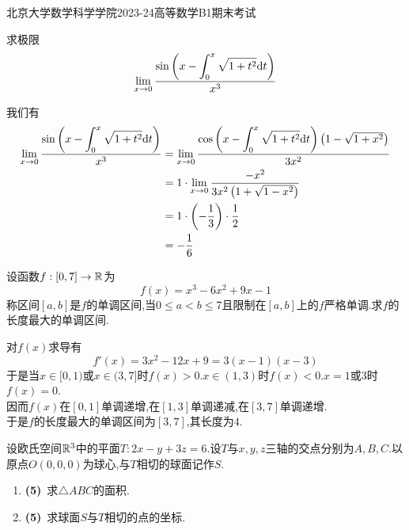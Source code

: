 \documentclass{ctexart}
\begin{document}
\pagestyle{empty}
\begin{center}\Large
    北京大学数学科学学院2023-24高等数学B1期末考试
\end{center}
\begin{problem}[1.(10\songti{分})]
    求极限\[\lim_{x\to0}\dfrac{\sin\left(x-\displaystyle\int_0^x\sqrt{1+t^2}\mathrm{d} t\right)}{x^3}\]
\end{problem}
\begin{solution}
    我们有
    \[\begin{aligned}
        \lim_{x\to0}\dfrac{\sin\left(x-\displaystyle\int_0^x\sqrt{1+t^2}\mathrm{d} t\right)}{x^3}
        &= \lim_{x\to0}\dfrac{\cos\left(x-\displaystyle\int_0^x\sqrt{1+t^2}\mathrm{d} t\right)\left(1-\sqrt{1+x^2}\right)}{3x^2} \\
        &= 1\cdot\lim_{x\to0}\dfrac{-x^2}{3x^2\left(1+\sqrt{1-x^2}\right)} \\
        &= 1\cdot\left(-\dfrac13\right)\cdot\dfrac12 \\
        &= -\dfrac16
    \end{aligned}\]
\end{solution}
\begin{problem}[2.(10\songti{分})]
    设函数$f:[0,7]\to\mathbb{R}$为\[f(x)=x^3-6x^2+9x-1\]称区间$[a,b]$是$f$的单调区间,当$0\leqslant a<b\leqslant 7$且限制在$[a,b]$上的$f$严格单调.求$f$的长度最大的单调区间.
\end{problem}
\begin{solution}
    对$f(x)$求导有
    \[f'(x)=3x^2-12x+9=3(x-1)(x-3)\]
    于是当$x\in[0,1)$或$x\in(3,7]$时$f(x)>0$.$x\in(1,3)$时$f(x)<0$.$x=1$或$3$时$f(x)=0$.\\
    因而$f(x)$在$[0,1]$单调递增,在$[1,3]$单调递减,在$[3,7]$单调递增.\\
    于是$f$的长度最大的单调区间为$[3,7]$,其长度为$4$.
\end{solution}
\begin{problem}[3.(10\songti{分})]
    设欧氏空间$\mathbb{R}^3$中的平面$T:2x-y+3z=6$.设$T$与$x,y,z$三轴的交点分别为$A,B,C$.以原点$O(0,0,0)$为球心,与$T$相切的球面记作$S$.
    \begin{enumerate}[label=\tbf{(\arabic*)}]
        \item \textbf{(5)}\ 求$\triangle ABC$的面积.
        \item \textbf{(5)}\ 求球面$S$与$T$相切的点的坐标.
    \end{enumerate}
\end{problem}
\end{document}
